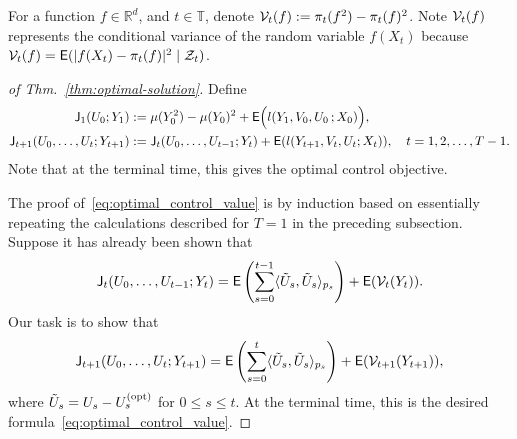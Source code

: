 \documentclass[twoside,11pt]{article}
\def\Re{\mathbb{R}}
\newcommand{\field}[1]{\mathbb{#1}}
\def\Re{\field{R}}
\def\clZ{{\cal Z}}
\def\E{{\sf E}}
\def\clZ{{\cal Z}}
\newcommand{\newP}[1]{\medskip\noindent{\bf #1:}}
\def\Re{\mathbb{R}}
\def\E{{\sf E}}
\def\Thm#1{Thm.~\ref{#1}}
\def\clZ{{\cal Z}}
\renewcommand{\Re}{\mathbb{R}}
\def\clV{{\cal V}}
\def\clZ{{\cal Z}}
\def\E{{\sf E}}
\def\sJ{{\sf J}}
\def\opt{{\text{\rm (opt)}}}
\begin{document}
\newP{Notation} 
For a function $f\in \Re^d$, and $t\in\mathbb{T}$, denote $
\clV_t(f) := \pi_t(f^2) - \pi_t(f)^2
$. Note $\clV_t(f)$
represents the conditional variance of the random variable $f(X_t)$ 
because $\clV_t(f)=\E(|f(X_t)-\pi_t(f)|^2 \mid \clZ_t)$.  

\medskip

\begin{proof}[of  \Thm{thm:optimal-solution}]
Define
\begin{align*}
\sJ_1(U_0;Y_1)  &:=
\mu(Y_0^2) - \mu(Y_0)^2 + 
                                        \E \Big( l (Y_1,V_0,U_0\,;X_0)
                \Big), \\
\sJ_{t+1}(U_0,\hdots,U_{t};Y_{t+1}) &:=
\sJ_{t}(U_0,\hdots,U_{t-1};Y_{t}) + \E (l(Y_{t+1},V_t,U_t;X_t) ),\quad t=1,2,\hdots,T-1.
\end{align*}
Note that at the terminal time, this gives the optimal control objective.

The proof of~\eqref{eq:optimal_control_value} is by induction based on
essentially repeating the calculations described for
$T=1$ in the preceding subsection.  Suppose it has already been shown that
\begin{equation*}
\sJ_{t}(U_0,\hdots,U_{t-1};Y_{t}) = \E \left( \sum_{s=0}^{t-1}
\langle \tilde{U}_s,\tilde{U}_s \rangle_{p_s} \right)+ \E ( \clV_t(Y_t)).
\end{equation*}
Our task is to show that 
\begin{equation*}
\sJ_{t+1}(U_0,\hdots,U_{t};Y_{t+1}) = \E \left( \sum_{s=0}^{t}
 \langle \tilde{U}_s,\tilde{U}_s \rangle_{p_s} \right) + \E ( \clV_{t+1}(Y_{t+1})),
\end{equation*}
where $\tilde{U}_s={U}_s - U_s^\opt$ for $0\leq s\leq t$.  At the
terminal time, this is the desired formula~\eqref{eq:optimal_control_value}.  


\end{proof}
\end{document}
